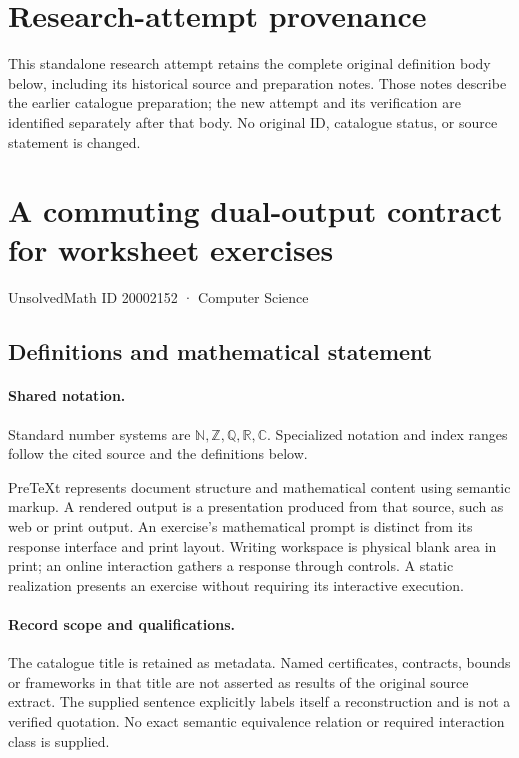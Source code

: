 \documentclass[11pt]{article}
\begin{document}
\section*{Research-attempt provenance}
This standalone research attempt retains the complete original definition body below,
including its historical source and preparation notes. Those notes describe the
earlier catalogue preparation; the new attempt and its verification are identified
separately after that body. No original ID, catalogue status, or source statement is changed.

\section{A commuting dual-output contract for worksheet exercises}\label{20002152}
{\small UnsolvedMath ID 20002152 · Computer Science}
\subsection{Definitions and mathematical statement}

\paragraph{Shared notation.}Standard number systems are $\mathbb N,\mathbb Z,\mathbb Q,\mathbb R,\mathbb C$. Specialized notation and index ranges follow the cited source and the definitions below.


PreTeXt represents document structure and mathematical content using semantic markup. A rendered output is a presentation produced from that source, such as web or print output. An exercise's mathematical prompt is distinct from its response interface and print layout. Writing workspace is physical blank area in print; an online interaction gathers a response through controls. A static realization presents an exercise without requiring its interactive execution.
\paragraph{Record scope and qualifications.}
The catalogue title is retained as metadata. Named certificates, contracts, bounds or frameworks in that title are not asserted as results of the original source extract.
The supplied sentence explicitly labels itself a reconstruction and is not a verified quotation. No exact semantic equivalence relation or required interaction class is supplied.
\end{document}
